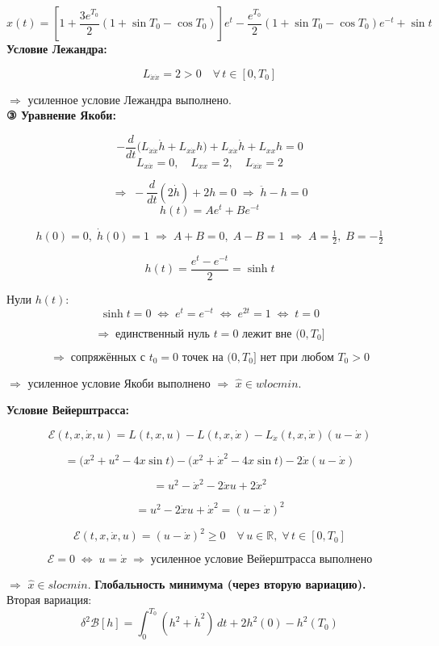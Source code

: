 \documentclass[12pt,a4paper,fleqn]{article}
\begin{document}
\[
\hat x(t)=\left[1+\frac{3e^{T_0}}{2}(1+\sin T_0-\cos T_0)\right]e^t-\frac{e^{T_0}}{2}(1+\sin T_0-\cos T_0)e^{-t}+\sin t
\]
\newpage
\bigskip
\textbf{Условие Лежандра:}

\[
L_{\dot x\dot x}=2>0\quad\forall\,t\in[0,T_0]
\]

$\Rightarrow$ усиленное условие Лежандра выполнено.\\
\vspace{0.7 cm}
\bigskip
\textbf{③ Уравнение Якоби:}

\[
-\frac{d}{dt}\bigl(L_{\dot x\dot x}\dot h+L_{x\dot x}h\bigr)+L_{x\dot x}\dot h+L_{xx}h=0
\]
\[
L_{x\dot x}=0,\quad L_{xx}=2,\quad L_{\dot x\dot x}=2
\]

\[
\Rightarrow\;-\frac{d}{dt}(2\dot h)+2h=0\;\Rightarrow\;\ddot h-h=0
\]
\[
h(t)=A e^t+B e^{-t}
\]

\[
h(0)=0,\;\dot h(0)=1\;\Rightarrow\;A+B=0,\;A-B=1\;\Rightarrow\;A=\tfrac12,\;B=-\tfrac12
\]

\[
h(t)=\frac{e^t-e^{-t}}{2}=\sinh t
\]

Нули $h(t)$:
\[
\sinh t=0\;\Leftrightarrow\;e^t=e^{-t}\;\Leftrightarrow\;e^{2t}=1\;\Leftrightarrow\;t=0
\]

\[
\Rightarrow\;\text{единственный нуль }t=0\text{ лежит вне }(0,T_0]
\]

\[
\Rightarrow\;\text{сопряжённых с }t_0=0\text{ точек на }(0,T_0]\text{ нет при любом }T_0>0
\]

$\Rightarrow$ усиленное условие Якоби выполнено $\Rightarrow$ $\hat x\in wlocmin$.

\newpage

\bigskip
\textbf{Условие Вейерштрасса:}

\[
\mathcal{E}(t,x,\dot x,u)=L(t,x,u)-L(t,x,\dot x)-L_{\dot x}(t,x,\dot x)(u-\dot x)
\]

\[
=\bigl(x^2+u^2-4x\sin t\bigr)-\bigl(x^2+\dot x^2-4x\sin t\bigr)-2\dot x(u-\dot x)
\]

\[
=u^2-\dot x^2-2\dot x u+2\dot x^2
\]

\[
=u^2-2\dot x u+\dot x^2=(u-\dot x)^2
\]

\[
\mathcal{E}(t,x,\dot x,u)=(u-\dot x)^2\geq 0\quad\forall\,u\in\mathbb{R},\;\forall\,t\in[0,T_0]
\]

\[
\mathcal{E}=0\;\Leftrightarrow\;u=\dot x\;\Rightarrow\;\text{усиленное условие Вейерштрасса выполнено}
\]

$\Rightarrow$ $\hat x\in slocmin$.
\newpage
\bigskip
\textbf{Глобальность минимума (через вторую вариацию).}\\
\vspace{0.5 cm}
Вторая вариация:
\[
\delta^2 \mathcal{B}[h]=\int_0^{T_0}(h^2+\dot h^2)\,dt+2h^2(0)-h^2(T_0)
\]
\end{document}
